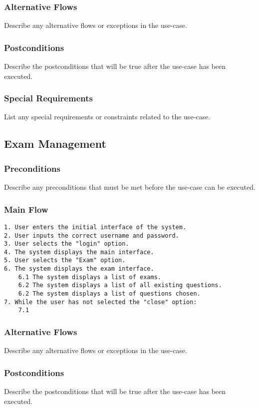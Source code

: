 \documentclass{article}
\begin{document}
\subsubsection{Alternative Flows}
Describe any alternative flows or exceptions in the use-case.

\subsubsection{Postconditions}
Describe the postconditions that will be true after the use-case has been executed.

\subsubsection{Special Requirements}
List any special requirements or constraints related to the use-case.

\subsection{Exam Management}
\subsubsection{Preconditions}
Describe any preconditions that must be met before the use-case can be executed.

\subsubsection{Main Flow}
\begin{verbatim}
1. User enters the initial interface of the system.
2. User inputs the correct username and password.
3. User selects the "login" option.
4. The system displays the main interface.
5. User selects the "Exam" option.
6. The system displays the exam interface.
    6.1 The system displays a list of exams.
    6.2 The system displays a list of all existing questions.
    6.2 The system displays a list of questions chosen. 
7. While the user has not selected the "close" option:
    7.1 
\end{verbatim}
\subsubsection{Alternative Flows}
Describe any alternative flows or exceptions in the use-case.

\subsubsection{Postconditions}
Describe the postconditions that will be true after the use-case has been executed.
\end{document}

